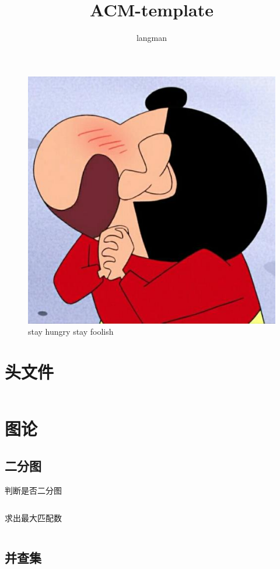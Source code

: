 \documentclass[a4paper,11pt]{article}
\author{langman}
\title{ACM-template}
\begin{document}
\maketitle
\vspace{3cm}
\begin{CJK}{UTF8}{gbsn}
    \begin{figure}[!htb]
      \begin{center}
        \includegraphics[width=0.80\linewidth]{../scoure/tupian.jpg}
        \caption{stay hungry stay foolish}
      \end{center}
    \end{figure}
\newpage
\tableofcontents
\newpage
\section{头文件}
\inputminted{c++}{../scoure/head.cpp}
\newpage
\section{图论}
\subsection{二分图}
判断是否二分图
\inputminted{c++}{../scoure/Graph_theory/pan2fen.cpp}
求出最大匹配数
\inputminted{c++}{../scoure/Graph_theory/2fentu.cpp}
\subsection{并查集}
\inputminted{c++}{../scoure/Graph_theory/bingchick.cpp}
\newpage

\end{CJK}
\end{document}
